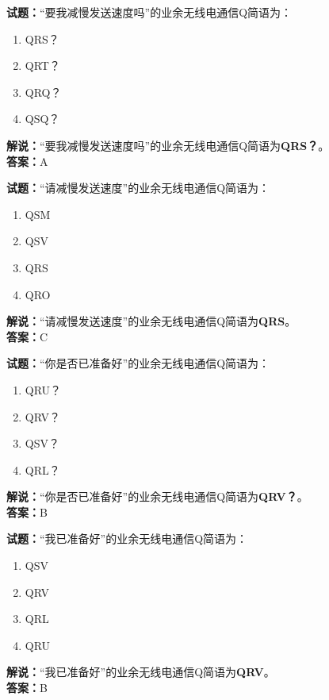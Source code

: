 \documentclass{ctexbook}
\begin{document}
\vspace{1em}

\textbf{试题：}“要我减慢发送速度吗”的业余无线电通信Q简语为：
\begin{enumerate}[leftmargin=3em]
  \item QRS？
  \item QRT？
  \item QRQ？
  \item QSQ？
\end{enumerate}
\noindent\textbf{解说：}“要我减慢发送速度吗”的业余无线电通信Q简语为\textbf{QRS？}。\\\noindent\textbf{答案：}A

\vspace{1em}

\textbf{试题：}“请减慢发送速度”的业余无线电通信Q简语为：
\begin{enumerate}[leftmargin=3em]
  \item QSM
  \item QSV
  \item QRS
  \item QRO
\end{enumerate}
\noindent\textbf{解说：}“请减慢发送速度”的业余无线电通信Q简语为\textbf{QRS}。\\\noindent\textbf{答案：}C

\vspace{1em}

\textbf{试题：}“你是否已准备好”的业余无线电通信Q简语为：
\begin{enumerate}[leftmargin=3em]
  \item QRU？
  \item QRV？
  \item QSV？
  \item QRL？
\end{enumerate}
\noindent\textbf{解说：}“你是否已准备好”的业余无线电通信Q简语为\textbf{QRV？}。\\\noindent\textbf{答案：}B

\vspace{1em}

\textbf{试题：}“我已准备好”的业余无线电通信Q简语为：
\begin{enumerate}[leftmargin=3em]
  \item QSV
  \item QRV
  \item QRL
  \item QRU
\end{enumerate}
\noindent\textbf{解说：}“我已准备好”的业余无线电通信Q简语为\textbf{QRV}。\\\noindent\textbf{答案：}B
\end{document}
